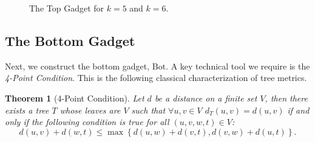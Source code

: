 \documentclass[11pt,letter]{article}
\newtheorem{theorem}{Theorem}[section]
\theoremstyle{remark}
\newcommand{\B}{\text{Bot}}
\newcommand{\set}[1]{\left\{#1\right\}}
\begin{document}
\begin{figure}[!h]
\begin{subfigure}{0.45\textwidth}
    \end{subfigure}
    \caption{The Top Gadget for $k=5$ and $k=6$.}
    \label{fig:top-gadget}
\end{figure}


\subsection{The Bottom Gadget}\label{sec:bot}

Next, we construct the bottom gadget, $\B$. 
A key technical tool we require is the {\em 4-Point Condition}. 
This is the following classical characterization of tree metrics. 
\begin{theorem}[4-Point Condition]\label{thm:4-PC} \cite{BUNEMAN197448}
    Let $d$ be a distance on a finite set $V$, then there exists a tree $T$ whose leaves are $V$ such that $\forall u,v\in V$ $d_T(u,v)=d(u,v)$ if and only if the following condition is true for all $(u,v,w,t)\in V$:
    \[d(u,v)+d(w,t)\leq \max\set{d(u,w)+d(v,t),d(v,w)+d(u,t)}.\]
\end{theorem}
\end{document}
